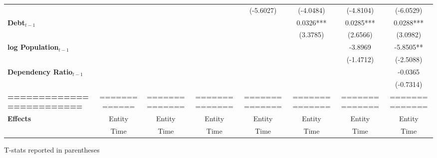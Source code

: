 \begin{center}
\begin{tabular}{lccccccc}
\textbf{ }                         &                   &                      &                           &     (-5.6027)      &    (-4.0484)    &         (-4.8104)         &          (-6.0529)            \\
\textbf{Debt$_{t-1}$}                &                   &                      &                           &                    &    0.0326***    &         0.0285***         &          0.0288***            \\
\textbf{ }                         &                   &                      &                           &                    &     (3.3785)    &          (2.6566)         &           (3.0982)            \\
\textbf{log Population$_{t-1}$}      &                   &                      &                           &                    &                 &          -3.8969          &          -5.8505**            \\
\textbf{ }                         &                   &                      &                           &                    &                 &         (-1.4712)         &          (-2.5088)            \\
\textbf{Dependency Ratio$_{t-1}$}   &                   &                      &                           &                    &                 &                           &           -0.0365             \\
\textbf{ }                         &                   &                      &                           &                    &                 &                           &          (-0.7314)            \\
\textbf{=========================} &   =============   &    ==============    &       ==============      &   ==============   &  ============== &       ==============      &        ==============         \\
\textbf{Effects}                   &       Entity      &        Entity        &           Entity          &       Entity       &      Entity     &           Entity          &            Entity             \\
\textbf{}                          &        Time       &         Time         &            Time           &        Time        &       Time      &            Time           &             Time              \\
\bottomrule
\end{tabular}
\end{center}

T-stats reported in parentheses